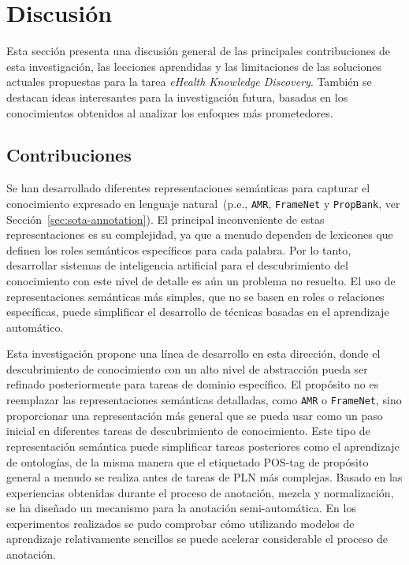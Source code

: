 \section{Discusión}
\label{chap2:discussion}

Esta sección presenta una discusión general de las principales contribuciones de esta investigación, las lecciones aprendidas y las limitaciones de las soluciones actuales propuestas para la tarea \textit{eHealth Knowledge Discovery}.
También se destacan ideas interesantes para la investigación futura, basadas en los conocimientos obtenidos al analizar los enfoques más prometedores.

\subsection{Contribuciones}

Se han desarrollado diferentes representaciones semánticas para capturar el conocimiento expresado en lenguaje natural~(p.e., \texttt{AMR}, \texttt{FrameNet} y \texttt{PropBank}, ver Sección~\ref{sec:sota-annotation}).
El principal inconveniente de estas representaciones es su complejidad, ya que a menudo dependen de lexicones que definen los roles semánticos específicos para cada palabra.
Por lo tanto, desarrollar sistemas de inteligencia artificial para el descubrimiento del conocimiento con este nivel de detalle es aún un problema no resuelto.
El uso de representaciones semánticas más simples, que no se basen en roles o relaciones específicas, puede simplificar el desarrollo de técnicas basadas en el aprendizaje automático.

Esta investigación propone una línea de desarrollo en esta dirección, donde el descubrimiento de conocimiento con un alto nivel de abstracción pueda ser refinado posteriormente para tareas de dominio específico.
El propósito no es reemplazar las representaciones semánticas detalladas, como \texttt{AMR} o \texttt{FrameNet}, sino proporcionar una representación más general que se pueda usar como un paso inicial en diferentes tareas de descubrimiento de conocimiento.
Este tipo de representación semántica puede simplificar tareas posteriores como el aprendizaje de ontologías, de la misma manera que el etiquetado POS-tag de propósito general a menudo se realiza antes de tareas de PLN más complejas.
Basado en las experiencias obtenidas durante el proceso de anotación, mezcla y normalización, se ha diseñado un mecanismo para la anotación semi-automática.
En los experimentos realizados se pudo comprobar cómo utilizando modelos de aprendizaje relativamente sencillos se puede acelerar considerable el proceso de anotación.


